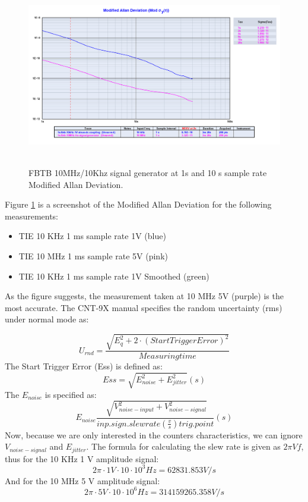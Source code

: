 \documentclass[11pt,english,a4paper]{article}
\begin{document}
\begin{figure}[!htb]
  \centering
    \includegraphics[width=1\textwidth]{fbtb_10mhzkhz_generator_mod_allan.png}\
  \caption{FBTB 10MHz/10Khz signal generator at 1s and 10 s sample rate Modified Allan Deviation.}
      \label{fig:sg_10x_mod_allan_dev}
\end{figure}

Figure \ref{fig:sg_10x_mod_allan_dev} is a screenshot of the Modified Allan Deviation for the following measurements:
\begin{itemize}
  \item TIE 10 KHz 1 ms sample rate 1V (blue)
  \item TIE 10 MHz 1 ms sample rate 5V (pink)
  \item TIE 10 KHz 1 ms sample rate 1V Smoothed (green)
\end{itemize}
As the figure suggests, the measurement taken at 10 MHz 5V (purple) is the most accurate. The CNT-9X manual specifies the random uncertainty (rms) under normal mode as:

\begin{displaymath}
U_{rnd}=\frac{\sqrt{E_{q}^2 + 2\cdot(Start Trigger Error)^2}}{Measuring time}
\end{displaymath}
The Start Trigger Error (Ess) is defined as:
\begin{displaymath}
Ess = \sqrt{ E_{noise}^2 + E_{jitter}^2 }(s)
\end{displaymath}
The $E_{noise}$ is specified as:
\begin{displaymath}
E_{noise}\frac{\sqrt[]{V_{noise-input}^2 + V_{noise-signal}^2}}{inp.sign.slew rate(\frac{v}{s}) trig. point}(s)
\end{displaymath}
Now, because we are only interested in the counters characteristics, we can ignore $V_{noise-signal}$ and $E_{jitter}$. The formula for calculating the slew rate is given as $2\pi Vf$, thus for the 10 KHz 1 V amplitude signal:
\begin{displaymath}
2\pi\cdot1 V\cdot10\cdot10^3 Hz = 62831.853 V/s
\end{displaymath}
And for the 10 MHz 5 V amplitude signal:
\begin{displaymath}
2\pi\cdot5 V\cdot10\cdot10^6 Hz = 314159265.358 V/s
\end{displaymath}
\end{document}
